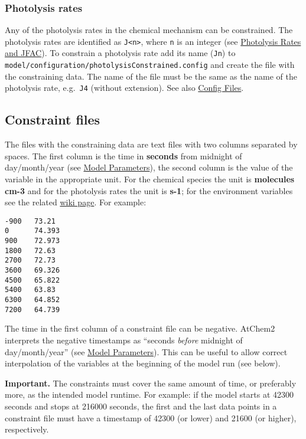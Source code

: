 \subsubsection{Photolysis rates} \label{photolysis-rates}

Any of the photolysis rates in the chemical mechanism can be
constrained. The photolysis rates are identified as
\texttt{J\textless{}n\textgreater{}}, where \texttt{n} is an integer
(see \hyperref[sec:photolysis]{Photolysis Rates and JFAC}). To
constrain a photolysis rate add its name (\texttt{Jn}) to
\texttt{model/configuration/photolysisConstrained.config} and create
the file with the constraining data. The name of the file must be the
same as the name of the photolysis rate, e.g.~\texttt{J4} (without
extension). See also \hyperref[sec:config]{Config Files}.

\subsection{Constraint files} \label{subsec:constraint-files}

The files with the constraining data are text files with two columns
separated by spaces. The first column is the time in \textbf{seconds}
from midnight of day/month/year (see \hyperref[sec:parameters]{Model
  Parameters}), the second column is the value of the variable in the
appropriate unit.  For the chemical species the unit is
\textbf{molecules cm-3} and for the photolysis rates the unit is
\textbf{s-1}; for the environment variables see the related
\hyperref[sec:envvar]{wiki page}. For example:

\begin{verbatim}
-900   73.21
0      74.393
900    72.973
1800   72.63
2700   72.73
3600   69.326
4500   65.822
5400   63.83
6300   64.852
7200   64.739
\end{verbatim}

The time in the first column of a constraint file can be negative.
AtChem2 interprets the negative timestamps as ``seconds \emph{before}
midnight of day/month/year'' (see \hyperref[sec:parameters]{Model
  Parameters}).  This can be useful to allow correct interpolation of
the variables at the beginning of the model run (see below).

\textbf{Important.} The constraints must cover the same amount of
time, or preferably more, as the intended model runtime. For example:
if the model starts at 42300 seconds and stops at 216000 seconds, the
first and the last data points in a constraint file must have a
timestamp of 42300 (or lower) and 21600 (or higher), respectively.

